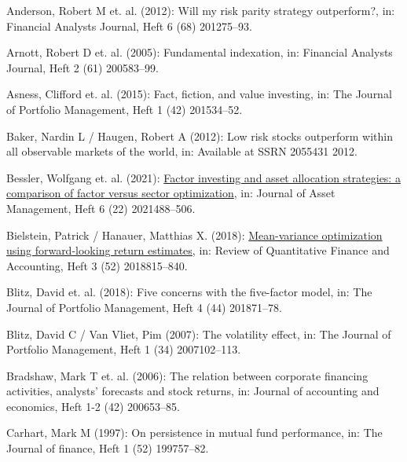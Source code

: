 \documentclass[a4paper,12pt]{article}
\begin{document}
\hypertarget{refs}{}
\begin{CSLReferences}{1}{0}
\leavevmode{}%
Anderson, Robert M et. al. (2012): Will my risk parity strategy outperform?, in: Financial Analysts Journal, Heft 6 (68) 201275--93.

\leavevmode{}%
Arnott, Robert D et. al. (2005): Fundamental indexation, in: Financial Analysts Journal, Heft 2 (61) 200583--99.

\leavevmode{}%
Asness, Clifford et. al. (2015): Fact, fiction, and value investing, in: The Journal of Portfolio Management, Heft 1 (42) 201534--52.

\leavevmode{}%
Baker, Nardin L / Haugen, Robert A (2012): Low risk stocks outperform within all observable markets of the world, in: Available at SSRN 2055431 2012.

\leavevmode{}%
Bessler, Wolfgang et. al. (2021): \href{https://doi.org/10.1057/s41260-021-00225-1}{Factor investing and asset allocation strategies: a comparison of factor versus sector optimization}, in: Journal of Asset Management, Heft 6 (22) 2021488--506.

\leavevmode{}%
Bielstein, Patrick / Hanauer, Matthias X. (2018): \href{https://doi.org/10.1007/s11156-018-0727-4}{Mean-variance optimization using forward-looking return estimates}, in: Review of Quantitative Finance and Accounting, Heft 3 (52) 2018815--840.

\leavevmode{}%
Blitz, David et. al. (2018): Five concerns with the five-factor model, in: The Journal of Portfolio Management, Heft 4 (44) 201871--78.

\leavevmode{}%
Blitz, David C / Van Vliet, Pim (2007): The volatility effect, in: The Journal of Portfolio Management, Heft 1 (34) 2007102--113.

\leavevmode{}%
Bradshaw, Mark T et. al. (2006): The relation between corporate financing activities, analysts' forecasts and stock returns, in: Journal of accounting and economics, Heft 1-2 (42) 200653--85.

\leavevmode{}%
Carhart, Mark M (1997): On persistence in mutual fund performance, in: The Journal of finance, Heft 1 (52) 199757--82.


\end{CSLReferences}
\end{document}
